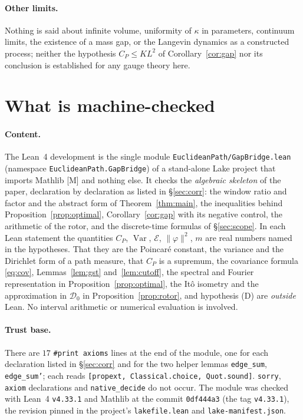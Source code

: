 \documentclass[11pt,a4paper]{article}
\theoremstyle{definition}
\theoremstyle{remark}
\newcommand{\Var}{\operatorname{Var}}
\newcommand{\cE}{\mathcal{E}}
\newcommand{\cD}{\mathcal{D}}
\newcommand{\code}[1]{\texttt{#1}}
\begin{document}
\paragraph{Other limits.}
Nothing is said about infinite volume, uniformity of $\kappa$ in parameters, continuum limits, the existence of a mass gap, or the Langevin dynamics as a constructed process; neither the hypothesis $C_P\le KL^2$ of Corollary~\ref{cor:gap} nor its conclusion is established for any gauge theory here.

\section{What is machine-checked}\label{sec:lean}

\paragraph{Content.}
The Lean~4 development is the single module \code{EuclideanPath/GapBridge.lean} (namespace \code{EuclideanPath.GapBridge}) of a stand-alone Lake project that imports Mathlib [M] and nothing else.
It checks the \emph{algebraic skeleton} of the paper, declaration by declaration as listed in \S\ref{sec:corr}: the window ratio and factor and the abstract form of Theorem~\ref{thm:main}, the inequalities behind Proposition~\ref{prop:optimal}, Corollary~\ref{cor:gap} with its negative control, the arithmetic of the rotor, and the discrete-time formulas of \S\ref{sec:scope}.
In each Lean statement the quantities $C_P$, $\Var$, $\cE$, $\|\varphi\|^2$, $m$ are real numbers named in the hypotheses.
That they are the Poincar\'e constant, the variance and the Dirichlet form of a path measure, that $C_P$ is a supremum, the covariance formula \eqref{eq:cov}, Lemmas~\ref{lem:gst} and~\ref{lem:cutoff}, the spectral and Fourier representation in Proposition~\ref{prop:optimal}, the It\^o isometry and the approximation in $\cD_0$ in Proposition~\ref{prop:rotor}, and hypothesis (D) are \emph{outside} Lean.
No interval arithmetic or numerical evaluation is involved.

\paragraph{Trust base.}
{\sloppy There are $17$ \code{\#print axioms} lines at the end of the module, one for each declaration listed in \S\ref{sec:corr} and for the two helper lemmas \code{edge\_sum}, \code{edge\_sum'}; each reads \code{[propext, Classical.choice, Quot.sound]}.
\code{sorry}, \code{axiom} declarations and \code{native\_decide} do not occur.
The module was checked with Lean~4 \code{v4.33.1} and Mathlib at the commit \code{0df444a3} (the tag \code{v4.33.1}), the revision pinned in the project's \code{lakefile.lean} and \code{lake-\allowbreak{}manifest.json}.\par}
\end{document}
